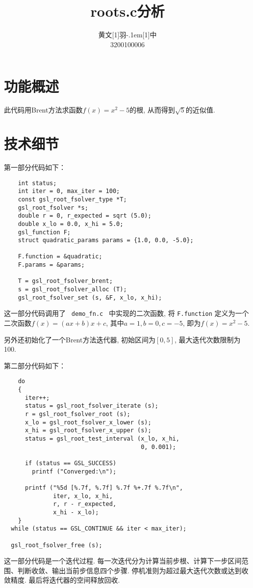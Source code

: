 \documentclass[UTF8]{ctexart}
\title{\textbf{roots.c分析}}
\author{\CJKfamily{kai} 黄文\hbox{\scalebox{0.6}[1]{羽}\kern-.1em\scalebox{0.5}[1]{中}}\\3200100006}
\begin{document}
\maketitle

\section{功能概述}

此代码用Brent方法求函数$f(x)=x^2-5$的根, 从而得到$\sqrt{5}$的近似值. 

\section{技术细节}

第一部分代码如下：

\begin{verbatim}
    int status;
    int iter = 0, max_iter = 100;
    const gsl_root_fsolver_type *T;
    gsl_root_fsolver *s;
    double r = 0, r_expected = sqrt (5.0);
    double x_lo = 0.0, x_hi = 5.0;
    gsl_function F;
    struct quadratic_params params = {1.0, 0.0, -5.0};
  
    F.function = &quadratic;
    F.params = &params;

    T = gsl_root_fsolver_brent;
    s = gsl_root_fsolver_alloc (T);
    gsl_root_fsolver_set (s, &F, x_lo, x_hi);
\end{verbatim}

这一部分代码调用了 \verb | demo_fn.c | 中实现的二次函数, 将 \verb |F.function| 定义为一个二次函数$f(x)=(ax+b)x+c$, 其中$a=1,b=0,c=-5$, 即为$f(x)=x^2-5$. 

另外还初始化了一个Brent方法迭代器, 初始区间为$[0,5]$, 最大迭代次数限制为100. 

第二部分代码如下：

\begin{verbatim}
    do
    {
      iter++;
      status = gsl_root_fsolver_iterate (s);
      r = gsl_root_fsolver_root (s);
      x_lo = gsl_root_fsolver_x_lower (s);
      x_hi = gsl_root_fsolver_x_upper (s);
      status = gsl_root_test_interval (x_lo, x_hi,
                                       0, 0.001);

      if (status == GSL_SUCCESS)
        printf ("Converged:\n");

      printf ("%5d [%.7f, %.7f] %.7f %+.7f %.7f\n",
              iter, x_lo, x_hi,
              r, r - r_expected, 
              x_hi - x_lo);
    }
  while (status == GSL_CONTINUE && iter < max_iter);

  gsl_root_fsolver_free (s);
\end{verbatim}

这一部分代码是一个迭代过程. 每一次迭代分为计算当前步根、计算下一步区间范围、判断收敛、输出当前步信息四个步骤. 停机准则为超过最大迭代次数或达到收敛精度. 最后将迭代器的空间释放回收. 
\end{document}
